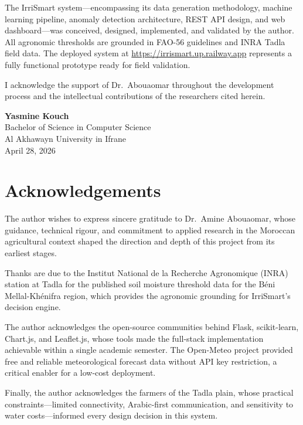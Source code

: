 \documentclass[12pt,a4paper]{report}
\begin{document}
The IrriSmart system---encompassing its data generation methodology, machine learning pipeline, anomaly detection architecture, REST API design, and web dashboard---was conceived, designed, implemented, and validated by the author. All agronomic thresholds are grounded in FAO-56 guidelines and INRA Tadla field data. The deployed system at \url{https://irrismart.up.railway.app} represents a fully functional prototype ready for field validation.

I acknowledge the support of Dr.\ Abouaomar throughout the development process and the intellectual contributions of the researchers cited herein.

\vspace{2cm}
\noindent\textbf{Yasmine Kouch}\\
Bachelor of Science in Computer Science\\
Al Akhawayn University in Ifrane\\
April 28, 2026

\chapter*{Acknowledgements}
\thispagestyle{fancy}

The author wishes to express sincere gratitude to Dr.\ Amine Abouaomar, whose guidance, technical rigour, and commitment to applied research in the Moroccan agricultural context shaped the direction and depth of this project from its earliest stages.

Thanks are due to the Institut National de la Recherche Agronomique (INRA) station at Tadla for the published soil moisture threshold data for the Béni Mellal-Khénifra region, which provides the agronomic grounding for IrriSmart's decision engine.

The author acknowledges the open-source communities behind Flask, scikit-learn, Chart.js, and Leaflet.js, whose tools made the full-stack implementation achievable within a single academic semester. The Open-Meteo project provided free and reliable meteorological forecast data without API key restriction, a critical enabler for a low-cost deployment.

Finally, the author acknowledges the farmers of the Tadla plain, whose practical constraints---limited connectivity, Arabic-first communication, and sensitivity to water costs---informed every design decision in this system.
\end{document}
